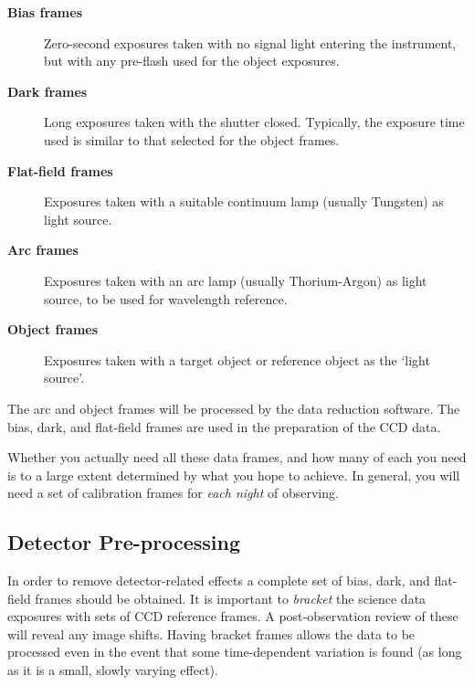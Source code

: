 \documentclass[twoside,11pt]{article}
\newcommand{\htmlref}[2]{#1}
\begin{document}
\begin{description}

\item [{\bf Bias frames}]
      Zero-second exposures taken with no signal light entering the
      instrument, but with any pre-flash used for the object exposures.

\item [{\bf Dark frames}]
      Long exposures taken with the shutter closed.  Typically, the
      exposure time used is similar to that selected for the object
      frames.

\item [{\bf Flat-field frames}]
      Exposures taken with a suitable \htmlref{continuum}{gl_continuum}
      lamp (usually Tungsten) as light source.

\item [{\bf Arc frames}]
      Exposures taken with an \htmlref{arc lamp}{gl_arc}
      (usually Thorium-Argon) as
      light source, to be used for \htmlref{wavelength
      reference}{gl_wavelength}.

\item [{\bf Object frames}]
      Exposures taken with a target object or reference object as the
      `light source'.

\end{description}

The arc and object frames will be processed by the data reduction software.
The bias, dark, and flat-field frames are used in the preparation of the
\htmlref{CCD}{gl_ccd} data.

Whether you actually need all these data frames, and how many of each
you need is to a large extent determined by what you hope to achieve.
In general, you will need a set of calibration frames for {\em each
night} of observing.


\subsection{Detector Pre-processing}

In order to remove detector-related effects a complete set of
\htmlref{bias}{gl_bias_frame}, \htmlref{dark}{gl_dark_frame},
and
\htmlref{flat-field}{gl_flat_field} frames should be obtained.
It is important to {\em
\htmlref{bracket}{gl_bracketing}} the science data exposures with
sets of \htmlref{CCD}{gl_ccd}
reference frames.  A post-observation review of these will reveal
any image shifts.  Having bracket frames allows the data to be
processed even in the event that some time-dependent variation
is found (as long as it is a small, slowly varying effect).
\end{document}
